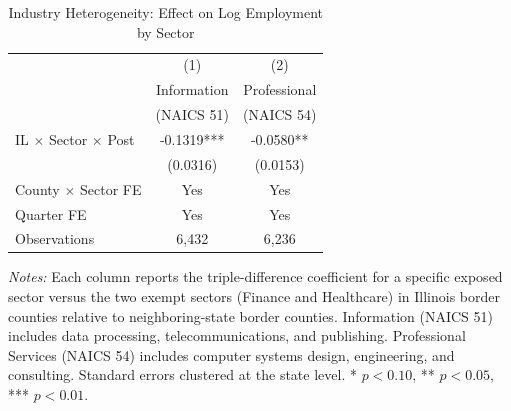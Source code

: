 \begin{table}[H]
\centering
\caption{Industry Heterogeneity: Effect on Log Employment by Sector}
\label{tab:het}
\begin{threeparttable}
\begin{tabular}{lcc}
\toprule
 & (1) & (2) \\
 & Information & Professional \\
 & (NAICS 51) & (NAICS 54) \\
\midrule
IL $\times$ Sector $\times$ Post & -0.1319*** & -0.0580** \\
 & (0.0316) & (0.0153) \\
\midrule
County $\times$ Sector FE & Yes & Yes \\
Quarter FE & Yes & Yes \\
Observations & 6,432 & 6,236 \\
\bottomrule
\end{tabular}
\begin{tablenotes}[flushleft]
\small
\item \textit{Notes:} Each column reports the triple-difference coefficient for a specific exposed sector versus the two exempt sectors (Finance and Healthcare) in Illinois border counties relative to neighboring-state border counties. Information (NAICS 51) includes data processing, telecommunications, and publishing. Professional Services (NAICS 54) includes computer systems design, engineering, and consulting. Standard errors clustered at the state level. * $p<0.10$, ** $p<0.05$, *** $p<0.01$.
\end{tablenotes}
\end{threeparttable}
\end{table}

